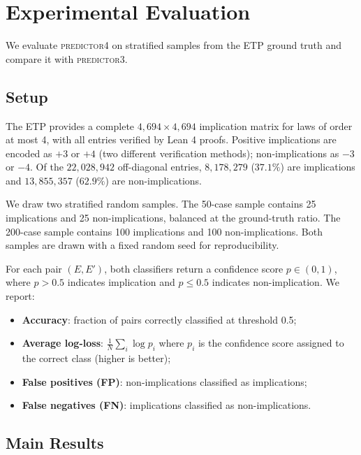 \section{Experimental Evaluation}
\label{sec:experiments}

We evaluate \textsc{predictor4} on stratified samples from the ETP ground truth
\cite{etp2025} and compare it with \textsc{predictor3}.

\subsection{Setup}

The ETP provides a complete $4{,}694 \times 4{,}694$ implication matrix for laws
of order at most 4, with all entries verified by Lean 4 proofs.  Positive
implications are encoded as $+3$ or $+4$ (two different verification methods);
non-implications as $-3$ or $-4$.  Of the $22{,}028{,}942$ off-diagonal entries,
$8{,}178{,}279$ ($37.1\%$) are implications and $13{,}855{,}357$ ($62.9\%$) are
non-implications.

We draw two stratified random samples.  The 50-case sample contains 25 implications
and 25 non-implications, balanced at the ground-truth ratio.  The 200-case sample
contains 100 implications and 100 non-implications.  Both samples are drawn with a
fixed random seed for reproducibility.

For each pair $(E, E')$, both classifiers return a confidence score $p \in (0, 1)$,
where $p > 0.5$ indicates implication and $p \leq 0.5$ indicates non-implication.
We report:
\begin{itemize}[leftmargin=*,itemsep=1pt,topsep=2pt]
  \item \textbf{Accuracy}: fraction of pairs correctly classified at threshold 0.5;
  \item \textbf{Average log-loss}: $\frac{1}{N}\sum_{i} \log p_i$ where $p_i$ is
        the confidence score assigned to the correct class (higher is better);
  \item \textbf{False positives (FP)}: non-implications classified as implications;
  \item \textbf{False negatives (FN)}: implications classified as non-implications.
\end{itemize}

\subsection{Main Results}

